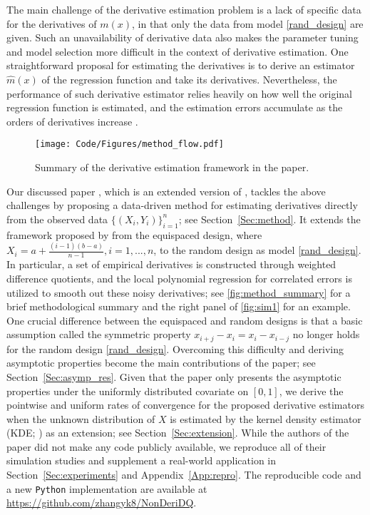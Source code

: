 \documentclass{uwstat572}
\theoremstyle{definition}
\renewcommand{\hat}{\widehat}
\theoremstyle{theorem}
\begin{document}
The main challenge of the derivative estimation problem is a lack of specific data for the derivatives of $m(x)$, in that only the data from model \eqref{rand_design} are given. Such an unavailability of derivative data also makes the parameter tuning and model selection more difficult in the context of derivative estimation. One straightforward proposal for estimating the derivatives is to derive an estimator $\hat{m}(x)$ of the regression function and take its derivatives. Nevertheless, the performance of such derivative estimator relies heavily on how well the original regression function is estimated, and the estimation errors accumulate as the orders of derivatives increase \citep{de2013derivative}. 

\begin{figure}
	\centering
	\texttt{[image: Code/Figures/method\_flow.pdf]}
	\caption{Summary of the derivative estimation framework in the paper.}
	\label{fig:method_summary}
\end{figure}

Our discussed paper \citep{liu2020smoothed}, which is an extended version of \cite{liu2018derivative}, tackles the above challenges by proposing a data-driven method for estimating derivatives directly from the observed data $\{(X_i,Y_i)\}_{i=1}^n$; see Section~\ref{Sec:method}. It extends the framework proposed by \cite{de2013derivative} from the equispaced design, where $X_i=a+\frac{(i-1)(b-a)}{n-1},i=1,...,n$, to the random design as model \eqref{rand_design}. In particular, a set of empirical derivatives is constructed through weighted difference quotients, and the local polynomial regression for correlated errors \citep{de2018local} is utilized to smooth out these noisy derivatives; see \autoref{fig:method_summary} for a brief methodological summary and the right panel of \autoref{fig:sim1} for an example. One crucial difference between the equispaced and random designs is that a basic assumption called the symmetric property $x_{i+j}-x_i=x_i-x_{i-j}$ no longer holds for the random design \eqref{rand_design}. Overcoming this difficulty and deriving asymptotic properties become the main contributions of the paper; see Section~\ref{Sec:asymp_res}. Given that the paper only presents the asymptotic properties under the uniformly distributed covariate on $[0,1]$, we derive the pointwise and uniform rates of convergence for the proposed derivative estimators when the unknown distribution of $X$ is estimated by the kernel density estimator (KDE; \citealt{rosenblatt1956remarks,parzen1962estimation,chen2017tutorial}) as an extension; see Section~\ref{Sec:extension}. While the authors of the paper did not make any code publicly available, we reproduce all of their simulation studies and supplement a real-world application in Section~\ref{Sec:experiments} and Appendix~\ref{App:repro}. The reproducible code and a new \texttt{Python} implementation are available at \url{https://github.com/zhangyk8/NonDeriDQ}.
\end{document}
